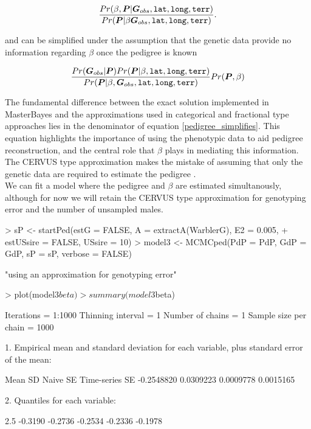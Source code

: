 \documentclass{article}
\begin{document}
\begin{equation}
\frac{Pr(\beta,  {\bm P}| {\bm G}_{obs}, \textrm{\texttt{lat}}, \textrm{\texttt{long}}, \textrm{\texttt{terr}})}{Pr({\bm P}| \beta {\bm G}_{obs}, \textrm{\texttt{lat}}, \textrm{\texttt{long}}, \textrm{\texttt{terr}})}.
\label{pedigree_expanded}
\end{equation}

and can be simplified  under the assumption that the genetic data provide no information regarding $\beta$ once the pedigree is known

\begin{equation}
\frac{Pr({\bm G}_{obs} | {\bm P})Pr({\bm P} | \beta,\textrm{\texttt{lat}}, \textrm{\texttt{long}}, \textrm{\texttt{terr}})}{Pr({\bm P}| \beta, {\bm G}_{obs}, \textrm{\texttt{lat}}, \textrm{\texttt{long}}, \textrm{\texttt{terr}})}Pr({\bm P}, \beta)
\label{pedigree_simplifies}
\end{equation}

The fundamental difference between the exact solution implemented in MasterBayes and the approximations used in categorical and fractional type approaches lies in the denominator of equation \ref{pedigree_simplifies}.  This equation highlights the importance of using the phenotypic data to aid pedigree reconstruction, and the central role that $\beta$ plays in mediating this information.  The CERVUS type approximation makes the mistake of assuming that only the genetic data are required to estimate the pedigree \citep[see the information boxes in][]{Hadfield.2006c}.\\

  We can fit a model where the pedigree and $\beta$ are estimated simultanously, although for now we will retain the CERVUS type approximation for genotyping error and the number of unsampled males.

\begin{Schunk}
\begin{Sinput}
> sP <- startPed(estG = FALSE, A = extractA(WarblerG), E2 = 0.005, 
+     estUSsire = FALSE, USsire = 10)
> model3 <- MCMCped(PdP = PdP, GdP = GdP, sP = sP, verbose = FALSE)
\end{Sinput}
\begin{Soutput}
[1] "using an approximation for genotyping error"
\end{Soutput}
\begin{Sinput}
> plot(model3$beta)
> summary(model3$beta)
\end{Sinput}
\begin{Soutput}
Iterations = 1:1000
Thinning interval = 1 
Number of chains = 1 
Sample size per chain = 1000 

1. Empirical mean and standard deviation for each variable,
   plus standard error of the mean:

          Mean             SD       Naive SE Time-series SE 
    -0.2548820      0.0309223      0.0009778      0.0015165 

2. Quantiles for each variable:

   2.5%
-0.3190 -0.2736 -0.2534 -0.2336 -0.1978 
\end{Soutput}
\end{Schunk}
 
\end{document}
